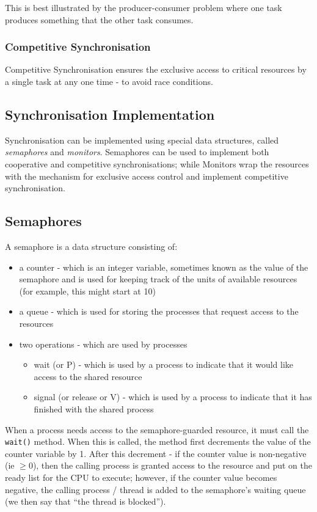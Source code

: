 This is best illustrated by the producer-consumer problem where one task produces something that the other task consumes. 

\subsubsection{Competitive Synchronisation}
Competitive Synchronisation ensures the exclusive access to critical resources by a single task at any one time - to avoid race conditions.

\subsection{Synchronisation Implementation}
Synchronisation can be implemented using special data structures, called \textit{semaphores} and \textit{monitors}. Semaphores can be used to implement both cooperative and competitive synchronisations; while Monitors wrap the resources with the mechanism for exclusive access control and implement competitive synchronisation. 

\subsection{Semaphores}
A semaphore is a data structure consisting of:
\begin{itemize}
    \item a counter - which is an integer variable, sometimes known as the value of the semaphore and is used for keeping track of the units of available resources (for example, this might start at 10)
    \item a queue - which is used for storing the processes that request access to the resources
    \item two operations - which are used by processes
    \begin{itemize}
        \item wait (or P) - which is used by a process to indicate that it would like access to the shared resource
        \item signal (or release or V) - which is used by a process to indicate that it has finished with the shared process
    \end{itemize}
\end{itemize}

When a process needs access to the semaphore-guarded resource, it must call the \verb|wait()| method. When this is called, the method first decrements the value of the counter variable by 1. After this decrement - if the counter value is non-negative (ie $\geq 0$), then the calling process is granted access to the resource and put on the ready list for the CPU to execute; however, if the counter value becomes negative, the calling process / thread is added to the semaphore's waiting queue (we then say that ``the thread is blocked'').\\


